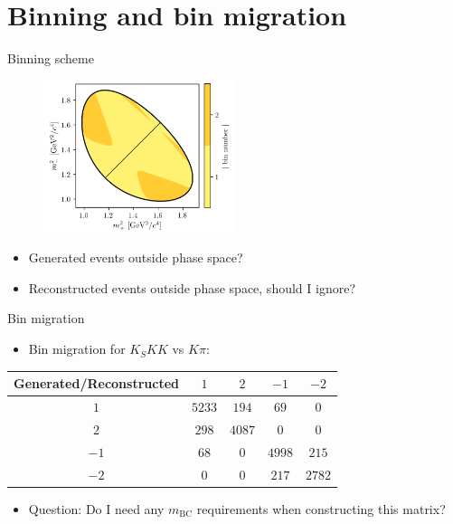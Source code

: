 \documentclass{beamer}
\begin{document}
\section{Binning and bin migration}
\begin{frame}{Binning scheme}
  \begin{figure}
    \centering
    \includegraphics[width=0.5\textwidth]{KSKK2Bin.png}
  \end{figure}
  \begin{itemize}
    \item{Generated events outside phase space?}
    \item{Reconstructed events outside phase space, should I ignore?}
  \end{itemize}
\end{frame}

\begin{frame}{Bin migration}
  \begin{itemize}
    \item{Bin migration for $K_SKK$ vs $K\pi$:}
  \end{itemize}
  \vspace{0.5cm}
  \centering
  \def\arraystretch{1.2}%
  \begin{tabular}{c|cccc}
    \hline
    Generated/Reconstructed & $1$    & $2$    & $-1$   & $-2$ \\
    \hline
    $1$                     & $5233$ & $194$  & $69$   & $0$ \\
    $2$                     & $298$  & $4087$ & $0$    & $0$ \\
    $-1$                    & $68$   & $0$    & $4998$ & $215$ \\
    $-2$                    & $0$    & $0$    & $217$  & $2782$ \\
    \hline
  \end{tabular}
  \vspace{0.5cm}
  \begin{itemize}
    \item{Question: Do I need any $m_\text{BC}$ requirements when constructing this matrix?}
  \end{itemize}
\end{frame}
\end{document}
